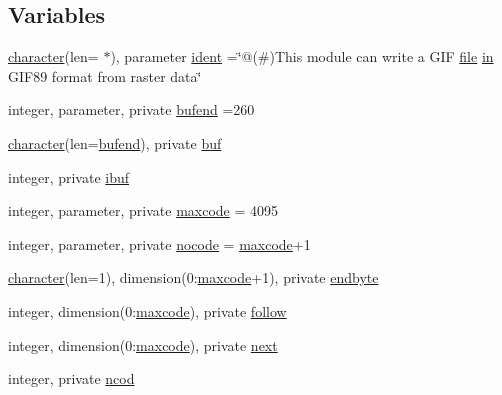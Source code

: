 \subsection*{Variables}
\begin{DoxyCompactItemize}
\item 
\hyperlink{option__stopwatch_83_8txt_abd4b21fbbd175834027b5224bfe97e66}{character}(len= $\ast$), parameter \hyperlink{namespacem__writegif_af1faf3b881fa6aee6d82b06da4dc3714}{ident} =\char`\"{}@(\#)This module can write a G\+IF \hyperlink{what__overview_81_8txt_a447b56c526e8da30e0dc94673727ee25}{file} \hyperlink{M__journal_83_8txt_afce72651d1eed785a2132bee863b2f38}{in} G\+I\+F89 format from raster data\char`\"{}
\item 
integer, parameter, private \hyperlink{namespacem__writegif_accdaeeac4357a3dc3dead0ba36e7efd4}{bufend} =260
\item 
\hyperlink{option__stopwatch_83_8txt_abd4b21fbbd175834027b5224bfe97e66}{character}(len=\hyperlink{namespacem__writegif_accdaeeac4357a3dc3dead0ba36e7efd4}{bufend}), private \hyperlink{namespacem__writegif_aa50fc715675e43931ce58f557bf8eb02}{buf}
\item 
integer, private \hyperlink{namespacem__writegif_a51ee343cdcbf2cd11f1b3740651077eb}{ibuf}
\item 
integer, parameter, private \hyperlink{namespacem__writegif_ac55f9abf33971ad396b2ae59b288b0bb}{maxcode} = 4095
\item 
integer, parameter, private \hyperlink{namespacem__writegif_a39141257b89b2cea89b4db4e0a372ffa}{nocode} = \hyperlink{namespacem__writegif_ac55f9abf33971ad396b2ae59b288b0bb}{maxcode}+1
\item 
\hyperlink{option__stopwatch_83_8txt_abd4b21fbbd175834027b5224bfe97e66}{character}(len=1), dimension(0\+:\hyperlink{namespacem__writegif_ac55f9abf33971ad396b2ae59b288b0bb}{maxcode}+1), private \hyperlink{namespacem__writegif_a43cdcf79f632247eaebb73fc3a7ff25f}{endbyte}
\item 
integer, dimension(0\+:\hyperlink{namespacem__writegif_ac55f9abf33971ad396b2ae59b288b0bb}{maxcode}), private \hyperlink{namespacem__writegif_aea2ce887598c0e5d80adb90558230c32}{follow}
\item 
integer, dimension(0\+:\hyperlink{namespacem__writegif_ac55f9abf33971ad396b2ae59b288b0bb}{maxcode}), private \hyperlink{namespacem__writegif_a592346fdf478d7727c143cd25ece2a96}{next}
\item 
integer, private \hyperlink{namespacem__writegif_aac26e9673fe5e79908a6ff576a298986}{ncod}
\item 

\end{DoxyCompactItemize}
